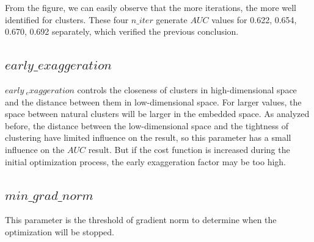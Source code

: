 \noindent From the figure, we can easily observe that the more iterations, the more well identified for clusters. These four $n\_iter$ generate $AUC$ values for 0.622, 0.654, 0.670, 0.692 separately, which verified the previous conclusion. 



\subsection{$early\_exaggeration$}

$ early\ _exaggeration $ controls the closeness of clusters in high-dimensional space and the distance between them in low-dimensional space. For larger values, the space between natural clusters will be larger in the embedded space. As analyzed before, the distance between the low-dimensional space and the tightness of clustering have limited influence on the result, so this parameter has a small influence on the $AUC$ result. But if the cost function is increased during the initial optimization process, the early exaggeration factor may be too high.

\subsection{$min\_grad\_norm$}

This parameter is the threshold of gradient norm to determine when the optimization will be stopped.